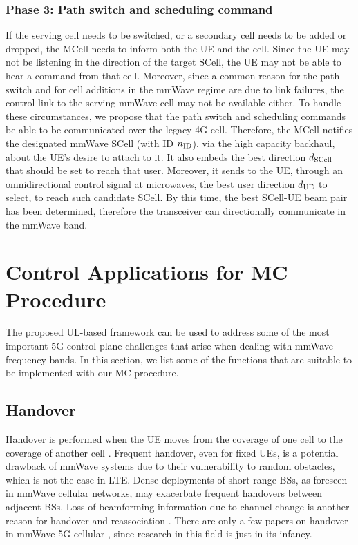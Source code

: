 \documentclass[conference,a4paper]{IEEEtran}
\begin{document}
\subsubsection{Phase 3:  Path switch and scheduling command}
If the serving cell needs to be switched, or a secondary cell needs to be added or dropped,
 the MCell needs to inform both the UE and the cell.
Since the UE may not be listening in the direction of the target SCell,
the UE may not be able to hear a command from that cell.  Moreover, since a common reason for
the path switch and for cell additions in the mmWave regime 
are due to link failures, the control link to the serving mmWave cell may not be available either.
To handle these circumstances, we propose that the path switch and scheduling commands
be able to be communicated over the legacy 4G cell.  Therefore, the MCell notifies  the designated mmWave SCell (with ID $n_{\rm ID}$), via the high capacity backhaul,  about the UE's desire to attach to it. It also embeds the best direction $d_{\rm SCell}$ that should be set to reach that user. Moreover, it sends to the UE, through an omnidirectional control signal at microwaves, the best user direction $d_{\rm UE}$ to select, to reach such candidate SCell. By this time, the best SCell-UE beam pair has been determined, therefore the transceiver can directionally communicate in the mmWave band.





\section{Control Applications for MC Procedure}
\label{sec:hints}

The proposed UL-based framework can be used to address some of the most important 5G control plane challenges that arise when dealing with mmWave frequency bands. In this section, we list some of the functions that are suitable to be implemented with our MC procedure.


\subsection{Handover}
\label{sec:HO}




Handover  is performed when the UE moves from the coverage of one cell to the coverage of another cell \cite{LTE_book}. Frequent handover, even for fixed UEs, is a potential drawback of mmWave systems due to their vulnerability to random obstacles, which is not the case in LTE. Dense deployments of short range BSs, as foreseen in mmWave cellular networks, may exacerbate frequent handovers between adjacent BSs. Loss of beamforming information due to channel change is another reason for handover and reassociation \cite{zorzi}. There are only a few papers on handover in mmWave 5G cellular \cite{handoff,HO_train,HO_het,HO_het_2}, since research in this field is just in its infancy.
\end{document}
